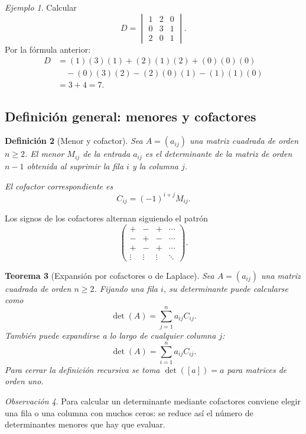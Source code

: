 \documentclass[12pt]{article}
\newtheorem{definicion}{Definición}[section]
\newtheorem{teorema}[definicion]{Teorema}
\theoremstyle{remark}
\newtheorem{observacion}[definicion]{Observación}
\newtheorem{ejemplo}[definicion]{Ejemplo}
\begin{document}
\begin{ejemplo}
Calcular
\[
D=\begin{vmatrix}1&2&0\\0&3&1\\2&0&1\end{vmatrix}.
\]
Por la fórmula anterior:
\begin{align*}
D&=(1)(3)(1)+(2)(1)(2)+(0)(0)(0)\\
&\quad -(0)(3)(2)-(2)(0)(1)-(1)(1)(0)\\
&=3+4=\boxed{7}.
\end{align*}
\end{ejemplo}

\subsection{Definición general: menores y cofactores}
\begin{definicion}[Menor y cofactor]
Sea $A=(a_{ij})$ una matriz cuadrada de orden $n\ge2$. El \emph{menor} $M_{ij}$ de la entrada $a_{ij}$ es el determinante de la matriz de orden $n-1$ obtenida al suprimir la fila $i$ y la columna $j$.

El \emph{cofactor} correspondiente es
\[
C_{ij}=(-1)^{i+j}M_{ij}.
\]
\end{definicion}

Los signos de los cofactores alternan siguiendo el patrón
\[
\begin{pmatrix}
+&-&+&\cdots\\-&+&-&\cdots\\+&-&+&\cdots\\\vdots&\vdots&\vdots&\ddots
\end{pmatrix}.
\]

\begin{teorema}[Expansión por cofactores o de Laplace]
Sea $A=(a_{ij})$ una matriz cuadrada de orden $n\ge2$. Fijando una fila $i$, su determinante puede calcularse como
\[
\boxed{\det(A)=\sum_{j=1}^{n}a_{ij}C_{ij}.}
\]
También puede expandirse a lo largo de cualquier columna $j$:
\[
\det(A)=\sum_{i=1}^{n}a_{ij}C_{ij}.
\]
Para cerrar la definición recursiva se toma $\det([a])=a$ para matrices de orden uno.
\end{teorema}

\begin{observacion}
Para calcular un determinante mediante cofactores conviene elegir una fila o una columna con muchos ceros: se reduce así el número de determinantes menores que hay que evaluar.
\end{observacion}
\end{document}
